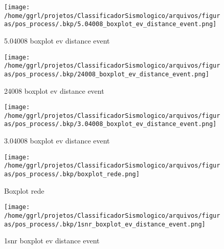                     \begin{figure}[H]
                        \centering
                        \texttt{[image: /home/ggrl/projetos/ClassificadorSismologico/arquivos/figuras/pos\_process/.bkp/5.04008\_boxplot\_ev\_distance\_event.png]}
                        \caption{5.04008 boxplot ev distance event}
                        \label{fig:5.04008_boxplot_ev_distance_event}
                    \end{figure}
                

                    \begin{figure}[H]
                        \centering
                        \texttt{[image: /home/ggrl/projetos/ClassificadorSismologico/arquivos/figuras/pos\_process/.bkp/24008\_boxplot\_ev\_distance\_event.png]}
                        \caption{24008 boxplot ev distance event}
                        \label{fig:24008_boxplot_ev_distance_event}
                    \end{figure}
                

                    \begin{figure}[H]
                        \centering
                        \texttt{[image: /home/ggrl/projetos/ClassificadorSismologico/arquivos/figuras/pos\_process/.bkp/3.04008\_boxplot\_ev\_distance\_event.png]}
                        \caption{3.04008 boxplot ev distance event}
                        \label{fig:3.04008_boxplot_ev_distance_event}
                    \end{figure}
                

                    \begin{figure}[H]
                        \centering
                        \texttt{[image: /home/ggrl/projetos/ClassificadorSismologico/arquivos/figuras/pos\_process/.bkp/boxplot\_rede.png]}
                        \caption{Boxplot rede}
                        \label{fig:boxplot_rede}
                    \end{figure}
                

                    \begin{figure}[H]
                        \centering
                        \texttt{[image: /home/ggrl/projetos/ClassificadorSismologico/arquivos/figuras/pos\_process/.bkp/1snr\_boxplot\_ev\_distance\_event.png]}
                        \caption{1snr boxplot ev distance event}
                        \label{fig:1snr_boxplot_ev_distance_event}
                    \end{figure}
                

